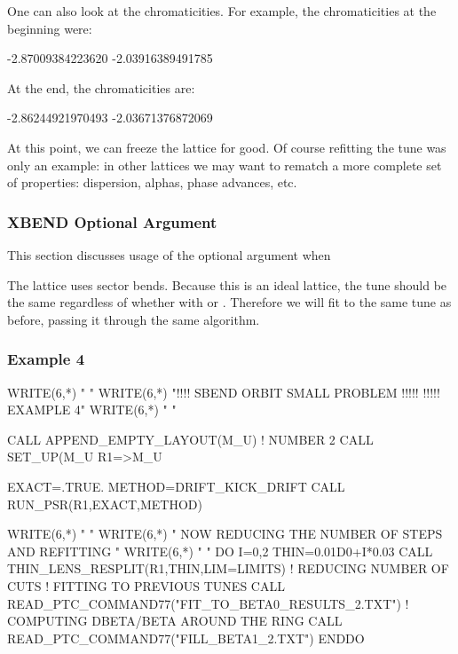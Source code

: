 One can also look at the chromaticities. For example, the chromaticities
at the beginning were:
\begin{ptccode}
-2.87009384223620       -2.03916389491785
\end{ptccode}

At the end, the chromaticities are:
\begin{ptccode}
-2.86244921970493       -2.03671376872069
\end{ptccode}

At this point, we can freeze the lattice for good. Of course refitting the tune
was only an example: in other lattices we may want to rematch a more
complete set of properties: dispersion, alphas, phase advances, etc.


\subsubsection{XBEND Optional Argument}

%
This section discusses usage of the  optional argument when 

The lattice uses sector bends. Because this is an ideal lattice, the tune should
be the same regardless of whether with  or .
Therefore we will fit to the same tune as before, passing it through the same
algorithm.


\subsubsection*{Example 4}

\begin{ptccode}
WRITE(6,*) "  "
WRITE(6,*) "!!!! SBEND ORBIT SMALL PROBLEM !!!!! !!!!!  EXAMPLE 4"
WRITE(6,*) "  "

CALL APPEND_EMPTY_LAYOUT(M_U)  ! NUMBER 2 
CALL SET_UP(M_U%
R1=>M_U%

EXACT=.TRUE.
METHOD=DRIFT_KICK_DRIFT
CALL RUN_PSR(R1,EXACT,METHOD)

WRITE(6,*) "  "
WRITE(6,*) " NOW REDUCING THE NUMBER OF STEPS AND REFITTING "
WRITE(6,*) "  "
DO I=0,2
 THIN=0.01D0+I*0.03
 CALL THIN_LENS_RESPLIT(R1,THIN,LIM=LIMITS) ! REDUCING NUMBER OF CUTS
 ! FITTING TO PREVIOUS TUNES
CALL READ_PTC_COMMAND77("FIT_TO_BETA0_RESULTS_2.TXT") 
  ! COMPUTING DBETA/BETA AROUND THE RING 
CALL READ_PTC_COMMAND77("FILL_BETA1_2.TXT")
ENDDO
\end{ptccode}

